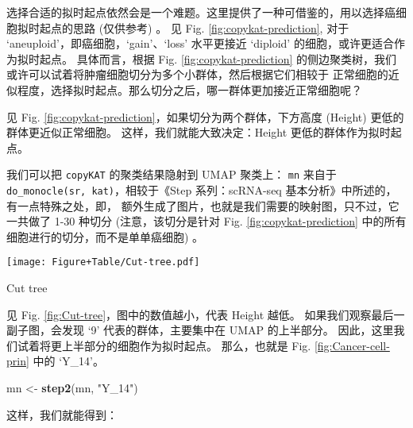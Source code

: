 \documentclass[
]{article}
\newenvironment{Shaded}{\begin{snugshade}}{\end{snugshade}}
\newcommand{\KeywordTok}[1]{\textcolor[rgb]{0.13,0.29,0.53}{\textbf{#1}}}
\newcommand{\NormalTok}[1]{#1}
\newcommand{\OperatorTok}[1]{\textcolor[rgb]{0.81,0.36,0.00}{\textbf{#1}}}
\newcommand{\StringTok}[1]{\textcolor[rgb]{0.31,0.60,0.02}{#1}}
\begin{document}
选择合适的拟时起点依然会是一个难题。这里提供了一种可借鉴的，用以选择癌细胞拟时起点的思路 (仅供参考) 。
见 Fig. \ref{fig:copykat-prediction}, 对于 `aneuploid'，即癌细胞，`gain'、`loss' 水平更接近
`diploid' 的细胞，或许更适合作为拟时起点。
具体而言，根据 Fig. \ref{fig:copykat-prediction} 的侧边聚类树，我们或许可以试着将肿瘤细胞切分为多个小群体，然后根据它们相较于
正常细胞的近似程度，选择拟时起点。那么切分之后，哪一群体更加接近正常细胞呢？

见 Fig. \ref{fig:copykat-prediction}，如果切分为两个群体，下方高度 (Height) 更低的群体更近似正常细胞。
这样，我们就能大致决定：Height 更低的群体作为拟时起点。

我们可以把 \texttt{copyKAT} 的聚类结果隐射到 UMAP 聚类上：
\texttt{mn} 来自于 \texttt{do\_monocle(sr,\ kat)}，相较于《Step 系列：scRNA-seq 基本分析》中所述的，有一点特殊之处，即，
额外生成了图片，也就是我们需要的映射图，只不过，它一共做了 1-30 种切分
(注意，该切分是针对 Fig. \ref{fig:copykat-prediction} 中的所有细胞进行的切分，而不是单单癌细胞) 。

\begin{Shaded}
\end{Shaded}

\def\@captype{figure}
\begin{center}
\texttt{[image: Figure+Table/Cut-tree.pdf]}
\caption{Cut tree}\label{fig:Cut-tree}
\end{center}

见 Fig. \ref{fig:Cut-tree}，图中的数值越小，代表 Height 越低。
如果我们观察最后一副子图，会发现 `9' 代表的群体，主要集中在 UMAP 的上半部分。
因此，这里我们试着将更上半部分的细胞作为拟时起点。
那么，也就是 Fig. \ref{fig:Cancer-cell-prin} 中的 `Y\_14'。

\begin{Shaded}
\begin{Highlighting}[]
\NormalTok{mn \textless{}{-}}\StringTok{ }\KeywordTok{step2}\NormalTok{(mn, }\StringTok{"Y\_14"}\NormalTok{)}
\end{Highlighting}
\end{Shaded}

这样，我们就能得到：

\begin{Shaded}
\end{Shaded}
\end{document}
